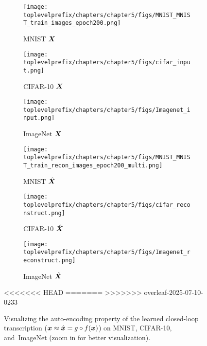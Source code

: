 \documentclass[\toplevelprefix/book-main.tex]{subfiles}
\begin{document}
\begin{figure}[t]
    \begin{subfigure}[t]{0.3\textwidth}
        \centering
        \texttt{[image: \\toplevelprefix/chapters/chapter5/figs/MNIST\_MNIST\_train\_images\_epoch200.png]}
        \caption{{\small MNIST $\bm{X}$}}
    \end{subfigure}
    \hfill
    \begin{subfigure}[t]{0.3\textwidth}
        \centering
        \texttt{[image: \\toplevelprefix/chapters/chapter5/figs/cifar\_input.png]}
        \caption{{\small CIFAR-10 $\bm{X}$}}
    \end{subfigure}
    \hfill
    \begin{subfigure}[t]{0.3\textwidth}
        \centering
        \texttt{[image: \\toplevelprefix/chapters/chapter5/figs/Imagenet\_input.png]}
        \caption{{\small ImageNet $\bm{X}$}}
    \end{subfigure}

    \begin{subfigure}[t]{0.3\textwidth}
        \centering
        \texttt{[image: \\toplevelprefix/chapters/chapter5/figs/MNIST\_MNIST\_train\_recon\_images\_epoch200\_multi.png]}
        \caption{{\small MNIST $\hat{\bm{X}}$}}
    \end{subfigure}
    \hfill
    \begin{subfigure}[t]{0.3\textwidth}
        \centering
        \texttt{[image: \\toplevelprefix/chapters/chapter5/figs/cifar\_reconstruct.png]}
        \caption{{\small CIFAR-10 $\hat{\bm{X}}$}}
    \end{subfigure}
    \hfill
    \begin{subfigure}[t]{0.3\textwidth}
        \centering
        \texttt{[image: \\toplevelprefix/chapters/chapter5/figs/Imagenet\_reconstruct.png]}
        \caption{{\small ImageNet $\hat{\bm{X}}$}}
    \end{subfigure}
    \caption{Visualizing the auto-encoding property of the learned closed-loop transcription \mbox{($\bm{x} \approx \hat{\bm{x}} = g\circ f(\bm{x})$)} on MNIST, CIFAR-10, and~ImageNet (zoom in for better visualization).}
<<<<<<< HEAD
    \label{fig:justfy_xhat_equals_x}
=======
    \label{fig:justfy_xhat_equals_x-1}
>>>>>>> overleaf-2025-07-10-0233
\end{figure}
     
\end{document}
